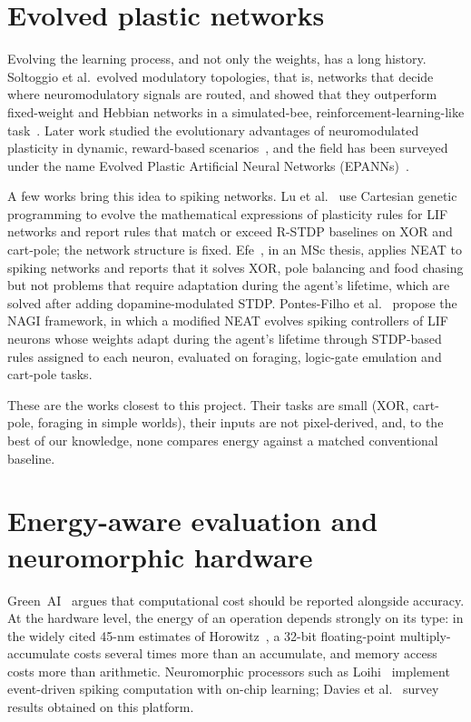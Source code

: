 \section{Evolved plastic networks}
\label{sec:sota-epann}

Evolving the learning process, and not only the weights, has a long history.
Soltoggio et al.\ evolved modulatory topologies, that is, networks that decide where neuromodulatory signals are routed, and showed that they outperform fixed-weight and Hebbian networks in a simulated-bee, reinforcement-learning-like task~\cite{soltoggio2007}.
Later work studied the evolutionary advantages of neuromodulated plasticity in dynamic, reward-based scenarios~\cite{soltoggio2008}, and the field has been surveyed under the name Evolved Plastic Artificial Neural Networks (EPANNs)~\cite{soltoggio2018born}.

A few works bring this idea to spiking networks.
Lu et al.~\cite{lu2022evolving} use Cartesian genetic programming to evolve the mathematical expressions of plasticity rules for LIF networks and report rules that match or exceed R-STDP baselines on XOR and cart-pole; the network structure is fixed.
Efe~\cite{efe2021}, in an MSc thesis, applies NEAT to spiking networks and reports that it solves XOR, pole balancing and food chasing but not problems that require adaptation during the agent's lifetime, which are solved after adding dopamine-modulated STDP.
Pontes-Filho et al.~\cite{pontesfilho2022} propose the NAGI framework, in which a modified NEAT evolves spiking controllers of LIF neurons whose weights adapt during the agent's lifetime through STDP-based rules assigned to each neuron, evaluated on foraging, logic-gate emulation and cart-pole tasks.

These are the works closest to this project.
Their tasks are small (XOR, cart-pole, foraging in simple worlds), their inputs are not pixel-derived, and, to the best of our knowledge, none compares energy against a matched conventional baseline.

\section{Energy-aware evaluation and neuromorphic hardware}
\label{sec:sota-energy}

Green~AI~\cite{schwartz2020green} argues that computational cost should be reported alongside accuracy.
At the hardware level, the energy of an operation depends strongly on its type: in the widely cited 45-nm estimates of Horowitz~\cite{horowitz2014computing}, a 32-bit floating-point multiply-accumulate costs several times more than an accumulate, and memory access costs more than arithmetic.
Neuromorphic processors such as Loihi~\cite{davies2018loihi} implement event-driven spiking computation with on-chip learning; Davies et al.~\cite{davies2021} survey results obtained on this platform.

